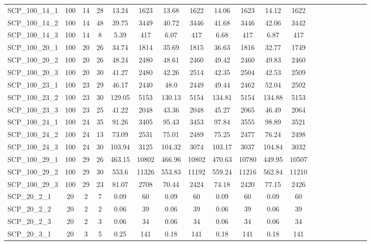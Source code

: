 \begin{sidewaystable}[!ht]
{\begin{tabular}{lccccccccccccccccccc}
SCP\_100\_14\_1 & 100 & 14 & 28 & 13.24 & 1623 & 13.68 & 1622 & 14.06 & 1623 & 14.12 & 1622 \\
SCP\_100\_14\_2 & 100 & 14 & 48 & 39.75 & 3449 & 40.72 & 3446 & 41.68 & 3446 & 42.06 & 3442 \\
SCP\_100\_14\_3 & 100 & 14 & 8 & 5.39 & 417 & 6.07 & 417 & 6.68 & 417 & 6.87 & 417 \\
SCP\_100\_20\_1 & 100 & 20 & 26 & 34.74 & 1814 & 35.69 & 1815 & 36.63 & 1816 & 32.77 & 1749 \\
SCP\_100\_20\_2 & 100 & 20 & 26 & 48.24 & 2480 & 48.61 & 2460 & 49.42 & 2460 & 49.83 & 2460 \\
SCP\_100\_20\_3 & 100 & 20 & 30 & 41.27 & 2480 & 42.26 & 2514 & 42.35 & 2504 & 42.53 & 2509 \\
SCP\_100\_23\_1 & 100 & 23 & 29 & 46.17 & 2440 & 48.0 & 2449 & 49.44 & 2462 & 52.04 & 2502 \\
SCP\_100\_23\_2 & 100 & 23 & 30 & 129.05 & 5153 & 130.13 & 5154 & 134.81 & 5154 & 134.88 & 5153 \\
SCP\_100\_23\_3 & 100 & 23 & 25 & 41.22 & 2048 & 43.36 & 2048 & 45.27 & 2065 & 46.49 & 2064 \\
SCP\_100\_24\_1 & 100 & 24 & 35 & 91.26 & 3405 & 95.43 & 3453 & 97.84 & 3555 & 98.89 & 3521 \\
SCP\_100\_24\_2 & 100 & 24 & 13 & 73.09 & 2531 & 75.01 & 2489 & 75.25 & 2477 & 76.24 & 2498 \\
SCP\_100\_24\_3 & 100 & 24 & 30 & 103.94 & 3125 & 104.32 & 3074 & 103.17 & 3037 & 104.84 & 3032 \\
SCP\_100\_29\_1 & 100 & 29 & 26 & 463.15 & 10802 & 466.96 & 10802 & 470.63 & 10780 & 449.95 & 10507 \\
SCP\_100\_29\_2 & 100 & 29 & 30 & 553.6 & 11326 & 553.83 & 11192 & 559.24 & 11216 & 562.84 & 11210 \\
SCP\_100\_29\_3 & 100 & 29 & 23 & 81.07 & 2708 &  \textcolor{blue2}{70.44} & 2424 & 74.18 & 2420 & 77.15 & 2426 \\
SCP\_20\_2\_1 & 20 & 2 & 7 & 0.09 & 60 & 0.09 & 60 & 0.09 & 60 & 0.09 & 60 \\
SCP\_20\_2\_2 & 20 & 2 & 2 &  \textcolor{blue2}{0.06} & 39 &  \textcolor{blue2}{0.06} & 39 &  \textcolor{blue2}{0.06} & 39 &  \textcolor{blue2}{0.06} & 39 \\
SCP\_20\_2\_3 & 20 & 2 & 3 & 0.06 & 34 & 0.06 & 34 & 0.06 & 34 & 0.06 & 34 \\
SCP\_20\_3\_1 & 20 & 3 & 5 & 0.25 & 141 &  \textcolor{blue2}{0.18} & 141 &  \textcolor{blue2}{0.18} & 141 &  \textcolor{blue2}{0.18} & 141 \\

\end{tabular}}
\end{sidewaystable}
